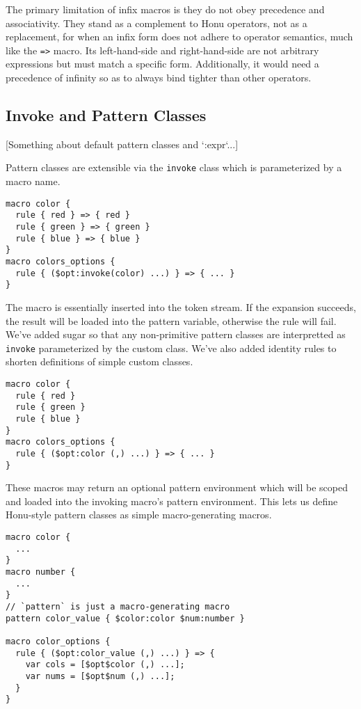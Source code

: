 \documentclass[preprint,10pt]{sigplanconf}
\begin{document}
The primary limitation of infix macros is they do not obey precedence
and associativity. They stand as a complement to Honu operators, not
as a replacement, for when an infix form does not adhere to operator
semantics, much like the \verb!=>! macro. Its left-hand-side and
right-hand-side are not arbitrary expressions but must match a
specific form. Additionally, it would need a precedence of infinity so
as to always bind tighter than other operators.

\subsection{Invoke and Pattern Classes}
\label{sec-4-2}

[Something about default pattern classes and `:expr`...]

Pattern classes are extensible via the \verb!invoke! class which is
parameterized by a macro name.

\begin{verbatim}
macro color {
  rule { red } => { red }
  rule { green } => { green }
  rule { blue } => { blue }
}
macro colors_options {
  rule { ($opt:invoke(color) ...) } => { ... }
}
\end{verbatim}

The macro is essentially inserted into the token stream. If the
expansion succeeds, the result will be loaded into the pattern
variable, otherwise the rule will fail. We've added sugar so that any
non-primitive pattern classes are interpretted as \verb!invoke!
parameterized by the custom class. We've also added identity rules to
shorten definitions of simple custom classes.

\begin{verbatim}
macro color {
  rule { red }
  rule { green }
  rule { blue }
}
macro colors_options {
  rule { ($opt:color (,) ...) } => { ... }
}
\end{verbatim}

These macros may return an optional pattern environment which will be
scoped and loaded into the invoking macro's pattern environment. This
lets us define Honu-style pattern classes as simple macro-generating
macros.

\begin{verbatim}
macro color {
  ...
}
macro number {
  ...
}
// `pattern` is just a macro-generating macro
pattern color_value { $color:color $num:number }

macro color_options {
  rule { ($opt:color_value (,) ...) } => {
    var cols = [$opt$color (,) ...];
    var nums = [$opt$num (,) ...];
  }
}

\end{verbatim}
\end{document}
